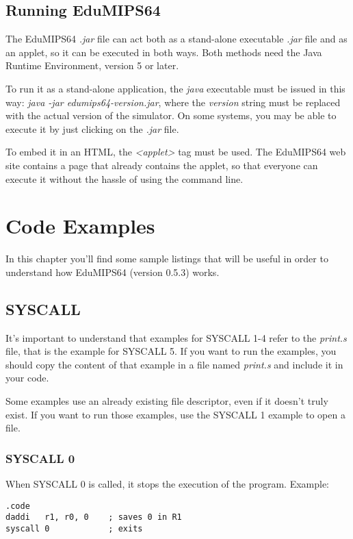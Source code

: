 \documentclass[letterpaper,10pt,english]{sphinxmanual}
\begin{document}
\section{Running EduMIPS64}
\label{user-interface:running-edumips64}
The EduMIPS64 \emph{.jar} file can act both as a stand-alone executable
\emph{.jar} file and as an applet, so it can be executed in both ways. Both
methods need the Java Runtime Environment, version 5 or later.

To run it as a stand-alone application, the \emph{java} executable must be
issued in this way: \emph{java -jar edumips64-version.jar}, where the
\emph{version} string must be replaced with the actual version of the
simulator. On some systems, you may be able to execute it by just clicking on
the \emph{.jar} file.

To embed it in an HTML, the \emph{\textless{}applet\textgreater{}} tag must be used. The EduMIPS64 web
site contains a page that already contains the applet, so
that everyone can execute it without the hassle of using the command line.


\chapter{Code Examples}
\label{examples:code-examples}\label{examples::doc}
In this chapter you'll find some sample listings that will be useful in
order to understand how EduMIPS64 (version 0.5.3) works.


\section{SYSCALL}
\label{examples:syscall}
It's important to understand that examples for SYSCALL 1-4 refer to the
\emph{print.s} file, that is the example for SYSCALL 5. If you want to run the
examples, you should copy the content of that example in a file named
\emph{print.s} and include it in your code.

Some examples use an already existing file descriptor, even if it doesn't truly
exist. If you want to run those examples, use the SYSCALL 1 example to open a
file.


\subsection{SYSCALL 0}
\label{examples:syscall-0}
When SYSCALL 0 is called, it stops the execution of the program.
Example:

\begin{Verbatim}[commandchars=@\[\]]
.code
daddi   r1, r0, 0    ; saves 0 in R1
syscall 0            ; exits
\end{Verbatim}
\end{document}
